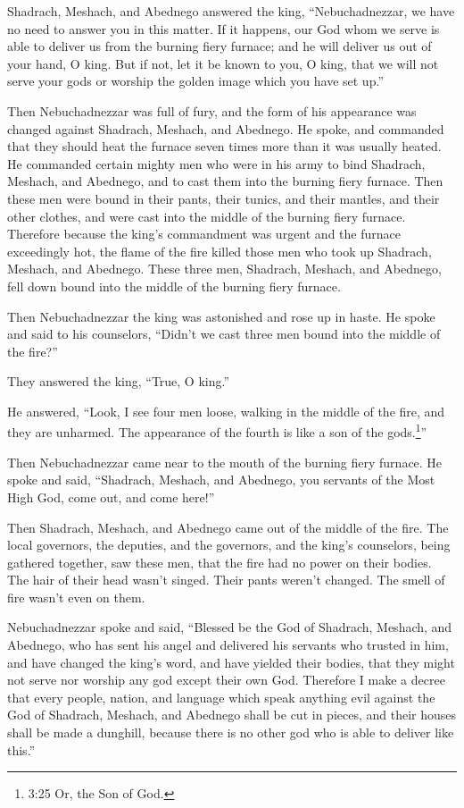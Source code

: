 \myverse{}Shadrach, Meshach, and Abednego answered the king, “Nebuchadnezzar,
we have no need to answer you in this matter.
\myverse{}If it happens, our God whom we serve is able to deliver us from the burning
fiery furnace; and he will deliver us out of your hand, O king.
\myverse{}But if not, let it be known to you, O king, that we will not serve your gods
or worship the golden image which you have set up.”

\myverse{}Then Nebuchadnezzar was full of fury, and the form of his appearance
was changed against Shadrach, Meshach, and Abednego. He spoke, and commanded that they should heat the
furnace seven times more than it was usually heated.
\myverse{}He commanded certain mighty men who were in his army to bind Shadrach, Meshach,
and Abednego, and to cast them into the burning fiery furnace.
\myverse{}Then these men were bound in their pants, their tunics, and their mantles,
and their other clothes, and were cast into the middle of the burning fiery furnace.
\myverse{}Therefore because the king’s commandment was urgent and the furnace exceedingly
hot, the flame of the fire killed those men who took up Shadrach, Meshach, and Abednego.
\myverse{}These three men, Shadrach, Meshach, and Abednego, fell down bound into the
middle of the burning fiery furnace.

\myverse{}Then Nebuchadnezzar the king was astonished and rose up in haste.
He spoke and said to his counselors, “Didn’t we cast three men bound into the middle of the fire?”

They answered the king, “True, O king.”

\myverse{}He answered, “Look, I see four men loose, walking in the middle
of the fire, and they are unharmed. The appearance of the fourth is like a son of the gods.\footnote{3:25 Or, the Son of God.}”

\myverse{}Then Nebuchadnezzar came near to the mouth of the burning fiery
furnace. He spoke and said, “Shadrach, Meshach, and Abednego, you servants of the Most High God, come
out, and come here!”

Then Shadrach, Meshach, and Abednego came out of the middle of the fire.
\myverse{}The local governors, the deputies, and the governors, and the king’s counselors,
being gathered together, saw these men, that the fire had no power on their bodies. The hair of their
head wasn’t singed. Their pants weren’t changed. The smell of fire wasn’t even on them.

\myverse{}Nebuchadnezzar spoke and said, “Blessed be the God of Shadrach,
Meshach, and Abednego, who has sent his angel and delivered his servants who trusted in him, and have
changed the king’s word, and have yielded their bodies, that they might not serve nor worship any god
except their own God.
\myverse{}Therefore I make a decree that every people, nation, and language which speak
anything evil against the God of Shadrach, Meshach, and Abednego shall be cut in pieces, and their houses
shall be made a dunghill, because there is no other god who is able to deliver like this.”

